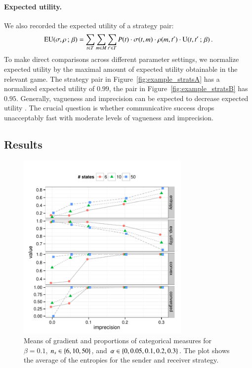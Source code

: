 \documentclass[fleqn,reqno,10pt]{article}
\newcommand{\imprecision}{\ensuremath{\alpha}} %
\newcommand{\toler}{\ensuremath{\beta}} %
\newcommand{\ns}{\ensuremath{n_s}} %
\renewcommand{\Pr}{\ensuremath{P}}
\begin{document}
\paragraph{Expected utility.} We also recorded the expected utility of
a strategy pair:
\begin{align*}
  \EU(\Sstrat,\Rstrat \myts ; \myts \toler) = \sum_{\state \in
    \States} \sum_{\messg \in \Messgs} \sum_{\state' \in \States}
  \Pr(\state) \cdot \Sstrat(\state, \messg) \cdot \Rstrat(\messg,
  \state') \cdot \Util(\state,\state' \myts ; \myts \toler)\,.
\end{align*}
To make direct comparisons across different parameter settings, we
normalize expected utility by the maximal amount of expected utility
obtainable in the relevant game. The strategy pair in
Figure~\ref{fig:example_stratsA} has a normalized expected utility of
$0.99$, the pair in Figure~\ref{fig:example_stratsB} has
$0.95$. Generally, vagueness and imprecision can be expected to
decrease expected utility
\citep[c.f.][]{Lipman2009:Why-is-Language}. The crucial question is
whether communicative success drops unacceptably fast with moderate
levels of vagueness and imprecision.

\subsection{Results}

\begin{figure}[t]
  \centering
  
  \includegraphics[width=0.75\textwidth]{plots/MeanMetrics3.pdf}

  \caption{Means of gradient and proportions of categorical measures
    for $\toler = 0.1$, $\ns \in \set{6, 10, 50}$, and $\imprecision
    \in \set{0, 0.05, 0.1, 0.2, 0.3}$. The plot shows the average of
    the entropies for the sender and receiver strategy.}
  \label{fig:MeanMetrics}
\end{figure}
\end{document}
